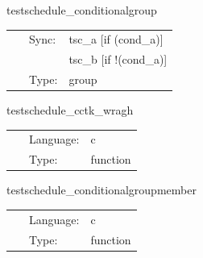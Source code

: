 \hspace{5mm} testschedule\_conditionalgroup 

\hspace{5mm}{\it test conditional clauses in schedule groups } 


\hspace{5mm}

 \begin{tabular*}{160mm}{cll} 
~ & Sync:  & tsc\_a [if (cond\_a)] \\ 
~& ~ &tsc\_b [if !(cond\_a)]\\ 
~ & Type:  & group \\ 
\end{tabular*} 


\vspace{5mm}


\hspace{5mm} testschedule\_cctk\_wragh 

\hspace{5mm}{\it test to see if function is placed in schedule and run at cctk\_wragh } 


\hspace{5mm}

 \begin{tabular*}{160mm}{cll} 
~ & Language:  & c \\ 
~ & Type:  & function \\ 
\end{tabular*} 


\vspace{5mm}


\hspace{5mm} testschedule\_conditionalgroupmember 

\hspace{5mm}{\it record that the schedule group with conditional clauses is executed } 


\hspace{5mm}

 \begin{tabular*}{160mm}{cll} 
~ & Language:  & c \\ 
~ & Type:  & function \\ 
\end{tabular*} 


\vspace{5mm}


